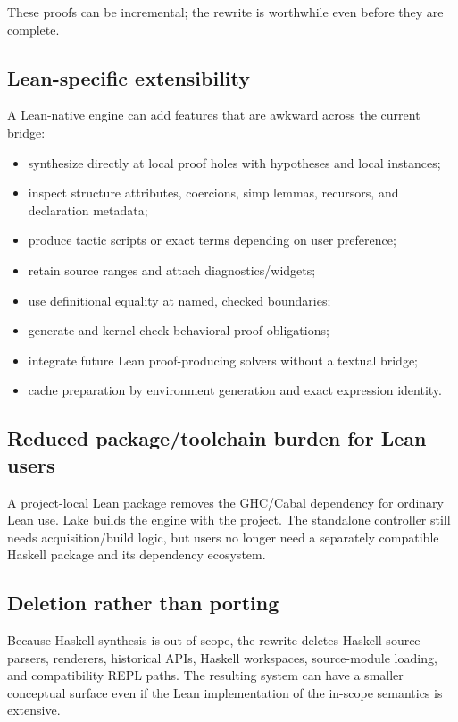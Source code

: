 \documentclass[10pt,letterpaper,oneside]{report}
\begin{document}
These proofs can be incremental; the rewrite is worthwhile even before they are complete.

\subsection{Lean-specific extensibility}

A Lean-native engine can add features that are awkward across the current bridge:

\begin{itemize}
  \item synthesize directly at local proof holes with hypotheses and local instances;
  \item inspect structure attributes, coercions, simp lemmas, recursors, and declaration metadata;
  \item produce tactic scripts or exact terms depending on user preference;
  \item retain source ranges and attach diagnostics/widgets;
  \item use definitional equality at named, checked boundaries;
  \item generate and kernel-check behavioral proof obligations;
  \item integrate future Lean proof-producing solvers without a textual bridge;
  \item cache preparation by environment generation and exact expression identity.
\end{itemize}

\subsection{Reduced package/toolchain burden for Lean users}

A project-local Lean package removes the GHC/Cabal dependency for ordinary Lean use. Lake builds the engine with the project. The standalone controller still needs acquisition/build logic, but users no longer need a separately compatible Haskell package and its dependency ecosystem.

\subsection{Deletion rather than porting}

Because Haskell synthesis is out of scope, the rewrite deletes Haskell source parsers, renderers, historical APIs, Haskell workspaces, source-module loading, and compatibility REPL paths. The resulting system can have a smaller conceptual surface even if the Lean implementation of the in-scope semantics is extensive.
\end{document}
